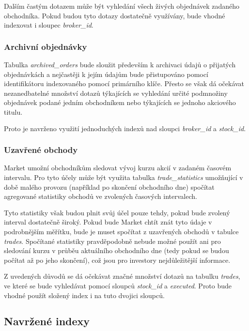 \documentclass[thesis=M,czech]{FITthesis}[2012/06/26]
\begin{document}
Dalším častým dotazem může být vyhledání všech živých objednávek zadaného obchodníka. Pokud budou tyto dotazy dostatečně využívány, bude vhodné 
indexovat i sloupec \textit{broker\_id}.

\subsubsection{Archivní objednávky}

Tabulka \textit{archived\_orders} bude sloužit především k archivaci údajů o přijatých objednávkách a nejčastěji k jejím údajům bude přistupováno pomocí 
identifikátoru indexovaného pomocí primárního klíče. Přesto se však dá očekávat nezanedbatelné množství dotazů týkajících se vyhledání určité podmnožiny
objednávek podané jedním obchodníkem nebo týkajících se jednoho akciového titulu.

Proto je navrženo využití jednoduchých indexů nad sloupci \textit{broker\_id} a \textit{stock\_id}.

\subsubsection{Uzavřené obchody}

Market umožní obchodníkům sledovat vývoj kurzu akcií v zadaném časovém intervalu. Pro tyto účely může být využita tabulka \textit{trade\_statistics} 
umožňující v době malého provozu (například po skončení obchodního dne) spočítat agregované statistiky obchodů ve zvolených časových intervalech. 

Tyto statistiky však budou plnit svůj účel pouze tehdy, pokud bude zvolený interval dostatečně široký. Pokud bude Market chtít znát tyto údaje v podrobnějším 
měřítku, bude je muset spočítat z uzavřených obchodů v tabulce \textit{trades}. Spočítané statistiky pravděpodobně nebude možné použít ani pro sledování 
kurzu v průběu aktuálního obchodního dne (tedy pokud se budou počítat až po jeho skončení), což jsou pro investory nejdůležitější informace.

Z uvedených důvodů se dá očekávat značné množství dotazů na tabulku \textit{trades}, ve které se bude vyhledávat pomocí sloupců \textit{stock\_id} a 
\textit{executed}. Proto bude vhodné použít složený index i na tuto dvojici sloupců. 


\subsection{Navržené indexy}
\end{document}
